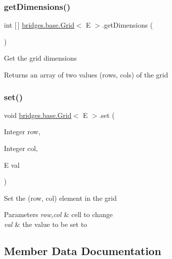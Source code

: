 \subsubsection{\texorpdfstring{get\+Dimensions()}{getDimensions()}}
{\footnotesize\ttfamily int \mbox{[}$\,$\mbox{]} \mbox{\hyperlink{classbridges_1_1base_1_1_grid}{bridges.\+base.\+Grid}}$<$ E $>$.get\+Dimensions (\begin{DoxyParamCaption}{ }\end{DoxyParamCaption})}

Get the grid dimensions

\begin{DoxyReturn}{Returns}
an array of two values (rows, cols) of the grid 
\end{DoxyReturn}
\mbox{\label{classbridges_1_1base_1_1_grid_ab79ceb737423bb28ea2348e61a625a17}} 
\subsubsection{\texorpdfstring{set()}{set()}}
{\footnotesize\ttfamily void \mbox{\hyperlink{classbridges_1_1base_1_1_grid}{bridges.\+base.\+Grid}}$<$ E $>$.set (\begin{DoxyParamCaption}\item[{Integer}]{row,  }\item[{Integer}]{col,  }\item[{E}]{val }\end{DoxyParamCaption})}

Set the (row, col) element in the grid 
\begin{DoxyParams}{Parameters}
{\em row,col} & cell to change \\
\hline
{\em val} & the value to be set to \\
\hline
\end{DoxyParams}


\subsection{Member Data Documentation}
\mbox{\label{classbridges_1_1base_1_1_grid_a45c2786d2af83624202192857a27724f}} 
